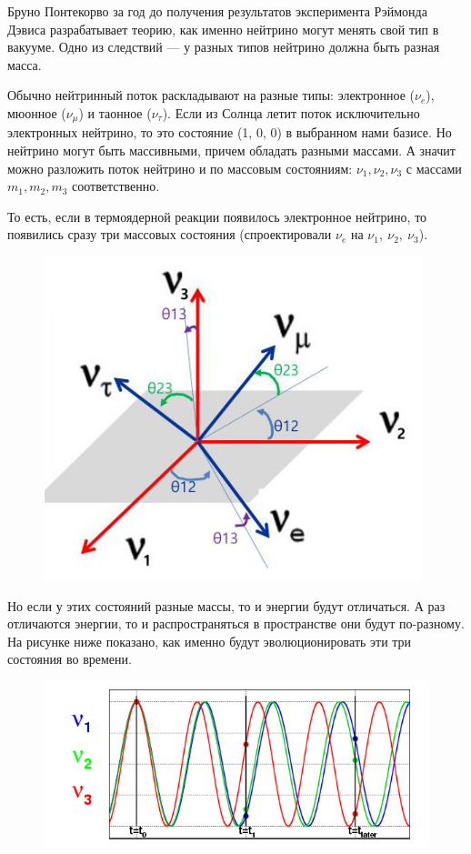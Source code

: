 \documentclass[a4paper,12pt]{article}
\begin{document}
 Бруно Понтекорво за год до получения результатов эксперимента Рэймонда Дэвиса разрабатывает теорию, как именно нейтрино могут менять свой тип в вакууме. Одно из следствий --- у разных типов нейтрино должна быть разная масса.

 Обычно нейтринный поток раскладывают на разные типы: электронное ($\nu_e$), мюонное ($\nu_\mu$) и таонное ($\nu_\tau$). Если из Солнца летит поток исключительно электронных нейтрино, то это состояние (1, 0, 0) в выбранном нами базисе. Но нейтрино могут быть массивными, причем обладать разными массами. А значит можно разложить поток нейтрино и по массовым состояниям: $\nu_1, \nu_2, \nu_3$ с массами $m_1, m_2, m_3$ соответственно.

То есть, если в термоядерной реакции появилось электронное нейтрино, то появились сразу три массовых состояния (спроектировали $\nu_e$ на $\nu_1,\ \nu_2,\ \nu_3$). 

\begin{figure}[H]
		\centering
		\includegraphics[width=110mm]{Images/muon_mass.jpg}
\end{figure}

Но если у этих состояний разные массы, то и энергии будут отличаться. А раз отличаются энергии, то и распространяться в пространстве они будут по-разному. На рисунке ниже показано, как именно будут эволюционировать эти три состояния во времени. 

\begin{figure}[H]
		\centering
		\includegraphics[width=160mm]{Images/muon_evolution.jpg}
\end{figure}
\end{document}
